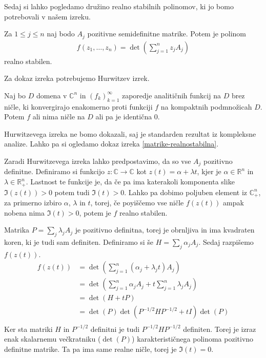 Sedaj si lahko pogledamo družino realno stabilnih polinomov, ki jo bomo potrebovali v našem izreku\cite{JuliusPetter}.
\begin{izrek}\label{matrike-realnostabilna}
    Za \(1\leq j \leq n\) naj bodo \(A_j\) pozitivne semidefinitne matrike. Potem je polinom
    \begin{align*}
        f(z_1, \ldots, z_n) = \det\left(\sum_{j=1}^n z_j A_j\right)
    \end{align*}
    realno stabilen.
\end{izrek}
Za dokaz izreka potrebujemo Hurwitzev izrek\cite{freitag1}.
\begin{izrek}\label{hurwitz}
    Naj bo \(D\) domena v \(\mathbb C^n\) in \((f_k)_{k=1}^\infty\) zaporedje analitičnih funkcij na \(D\) brez ničle, ki konvergirajo enakomerno proti funkciji \(f\) na kompaktnih podmnožicah \(D\). Potem \(f\) ali nima ničle na \(D\) ali pa je identična \(0\).
\end{izrek}
Hurwitzevega izreka ne bomo dokazali, saj je standarden rezultat iz kompleksne analize. Lahko pa si ogledamo dokaz izreka \ref{matrike-realnostabilna}.
\begin{dokaz}
    Zaradi Hurwitzevega izreka lahko predpostavimo, da so vse \(A_j\) pozitivno definitne. Definiramo si funkcijo \(z: \mathbb C\to \mathbb C\) kot \(z(t) = \alpha + \lambda t\), kjer je \(\alpha\in \mathbb R^n\) in \(\lambda \in \mathbb R_+^n\). Lastnost te funkcije je, da če pa ima katerakoli komponenta slike \(\Im(z(t))>0\) potem tudi \(\Im(t)>0\). Lahko pa dobimo poljuben element iz \(\mathbb C_+^n\), za primerno izbiro \(\alpha\), \(\lambda\) in \(t\), torej, če poyiščemo vse ničle \(f(z(t))\) ampak nobena nima \(\Im(t)>0\), potem je \(f\) realno stabilen.

    Matrika \(P = \sum_j \lambda_j A_j\) je pozitivno definitna, torej je obrnljiva in ima kvadraten koren, ki je tudi sam definiten. Definiramo si še \(H = \sum_j \alpha_j A_j\). Sedaj razpišemo \(f(z(t))\).
    \begin{align*}
        f(z(t)) & = \det\left(\sum_{j=1}^n (\alpha_j + \lambda_j t) A_j\right)                   \\
                & = \det\left(\sum_{j=1}^n \alpha_j A_j + t\sum_{j=1}^n \lambda_j A_j\right)     \\
                & = \det\left(H+ tP\right)                                                       \\
                & = \det\left(P\right)\det\left(P^{-1/2}HP^{-1/2} + tI\right) \det\left(P\right) \\
    \end{align*}
    Ker sta matriki \(H\) in \(P^{-1/2}\) definitni je tudi \(P^{-1/2}HP^{-1/2}\) definiten. Torej je izraz enak skalarnemu večkratniku (\(\det(P)\)) karakterističnega polinoma pozitivno definitne matrike. Ta pa ima same realne ničle, torej je \(\Im(t)=0\).
\end{dokaz}

